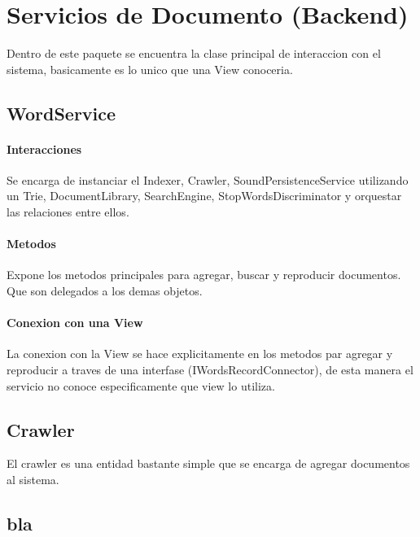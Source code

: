 \section{Servicios de Documento (Backend)}
Dentro de este paquete se encuentra la clase principal de interaccion con el sistema, basicamente es lo unico que una View conoceria.

\subsection{WordService}

\paragraph{Interacciones}
Se encarga de instanciar el Indexer, Crawler, SoundPersistenceService utilizando un Trie, DocumentLibrary, SearchEngine, StopWordsDiscriminator y orquestar las relaciones entre ellos.

\paragraph{Metodos}
Expone los metodos principales para agregar, buscar y reproducir documentos. Que son delegados a los demas objetos.

\paragraph{Conexion con una View}
La conexion con la View se hace explicitamente en los metodos par agregar y reproducir a traves de una interfase (IWordsRecordConnector), de esta manera el servicio no conoce especificamente que view lo utiliza.

\subsection{Crawler}
El crawler es una entidad bastante simple que se encarga de agregar documentos al sistema.

\subsection{bla}

